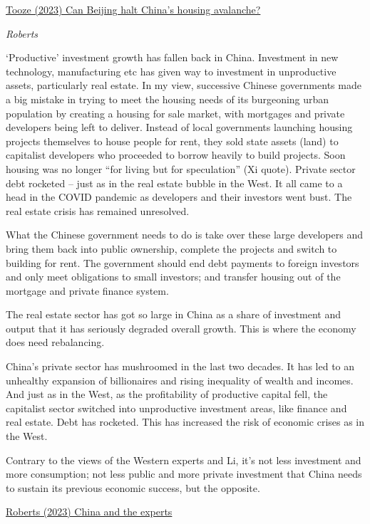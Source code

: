 \documentclass[
]{book}
\begin{document}
\href{https://adamtooze.substack.com/p/chartbook-194-can-beijing-halt-chinas}{Tooze (2023) Can Beijing halt China's housing avalanche?}

\emph{Roberts}

`Productive' investment growth has fallen back in China. Investment in new technology, manufacturing etc has given way to investment in unproductive assets, particularly real estate. In my view, successive Chinese governments made a big mistake in trying to meet the housing needs of its burgeoning urban population by creating a housing for sale market, with mortgages and private developers being left to deliver. Instead of local governments launching housing projects themselves to house people for rent, they sold state assets (land) to capitalist developers who proceeded to borrow heavily to build projects. Soon housing was no longer ``for living but for speculation'' (Xi quote). Private sector debt rocketed -- just as in the real estate bubble in the West. It all came to a head in the COVID pandemic as developers and their investors went bust.
The real estate crisis has remained unresolved.

What the Chinese government needs to do is take over these large developers and bring them back into public ownership, complete the projects and switch to building for rent. The government should end debt payments to foreign investors and only meet obligations to small investors; and transfer housing out of the mortgage and private finance system.

The real estate sector has got so large in China as a share of investment and output that it has seriously degraded overall growth. This is where the economy does need rebalancing.

China's private sector has mushroomed in the last two decades. It has led to an unhealthy expansion of billionaires and rising inequality of wealth and incomes. And just as in the West, as the profitability of productive capital fell, the capitalist sector switched into unproductive investment areas, like finance and real estate. Debt has rocketed. This has increased the risk of economic crises as in the West.

Contrary to the views of the Western experts and Li, it's not less investment and more consumption; not less public and more private investment that China needs to sustain its previous economic success, but the opposite.

\href{https://thenextrecession.wordpress.com/2023/03/05/china-and-the-experts/}{Roberts (2023) China and the experts}
\end{document}
